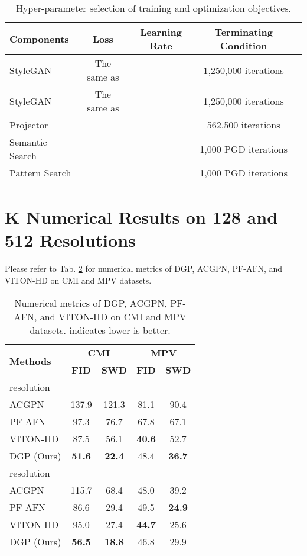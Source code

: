 \documentclass[10pt,twocolumn,letterpaper]{article}
\newcommand{\FID}{\textbf{FID}}  \newcommand{\PPL}{\textbf{PPL}}  \newcommand{\SSIM}{\textbf{SSIM}}  \newcommand{\SWD}{\textbf{SWD}}
\begin{document}
\begin{table}[!h]
\caption{
    Hyper-parameter selection of training and optimization objectives.
  }
  \label{tab:hyper}
  \centering
  \begin{tabular}{lcccc}
		\toprule
		Components & Loss & Learning Rate & Terminating Condition \\
		\midrule
        StyleGAN  &  The same as \cite{karras2020training}  &  &1,250,000 iterations\\
		StyleGAN  &  The same as \cite{karras2020training}  &  &1,250,000 iterations\\
		Projector  &  &  & 562,500 iterations\\
		Semantic Search &  &  & 1,000 PGD iterations\\
		Pattern Search &  &  & 1,000 PGD iterations\\
		\bottomrule
	\end{tabular}
\end{table}


\section*{K Numerical Results on 128 and 512 Resolutions}
Please refer to Tab. \ref{tab:different_resolution} for numerical metrics of DGP, ACGPN, PF-AFN, and VITON-HD on CMI and MPV datasets. 

\begin{table}[!h]
\caption{
    Numerical metrics of DGP, ACGPN, PF-AFN, and VITON-HD on CMI and MPV datasets.  indicates lower is better.
  }
  \label{tab:different_resolution}
  \centering
  \begin{tabular}{lcccc}
		\toprule
		\multirow{2}{*}{\textbf{Methods}} & \multicolumn{2}{c}{\textbf{CMI}} & \multicolumn{2}{c}{\textbf{MPV}} \\
		 \cmidrule(lr){2-3}\cmidrule(lr){4-5}& \FID & \SWD & \FID & \SWD\\
		\midrule
		 resolution & & & &\\
		\cmidrule(lr){1-1}ACGPN&137.9 &121.3&81.1 &90.4\\
		PF-AFN &97.3&76.7&67.8&67.1\\
		VITON-HD &87.5&56.1&\textbf{40.6}&52.7\\
		DGP (Ours) &\textbf{51.6}&\textbf{22.4}&48.4&\textbf{36.7}\\
		\midrule
		 resolution & & & &\\
	
		\cmidrule(lr){1-1}ACGPN&115.7 &68.4&48.0 &39.2\\
		PF-AFN &86.6&29.4&49.5&\textbf{24.9}\\
		VITON-HD &95.0&27.4&\textbf{44.7}&25.6\\
		DGP (Ours) &\textbf{56.5}&\textbf{18.8}&46.8&29.9\\
		\bottomrule
	\end{tabular} 
\end{table}
\end{document}
